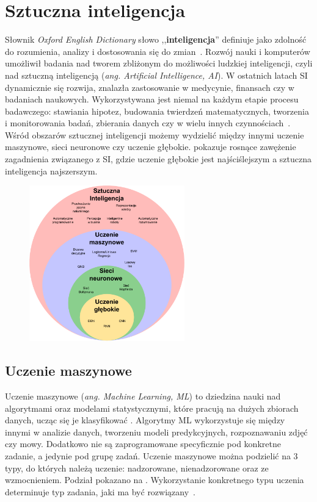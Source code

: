 \chapter{Sztuczna inteligencja}
Słownik \textit{Oxford English Dictionary} słowo ,,\textbf{inteligencja}'' definiuje jako zdolność do rozumienia, analizy i dostosowania się do zmian~\cite{OxfordJuly2023}. Rozwój nauki i komputerów umożliwił badania nad tworem zbliżonym do możliwości ludzkiej inteligencji, czyli nad sztuczną inteligencją (\textit{ang. Artificial Intelligence, AI}). W ostatnich latach SI dynamicznie się rozwija, znalazła zastosowanie w medycynie, finansach czy w badaniach naukowych. Wykorzystywana jest niemal na każdym etapie procesu badawczego: stawiania hipotez, budowania twierdzeń matematycznych, tworzenia i monitorowania badań, zbierania danych czy w wielu innych czynnościach~\cite{AiScience, Mahesh2018}. Wśród obszarów sztucznej inteligencji możemy wydzielić między innymi uczenie maszynowe, sieci neuronowe czy uczenie głębokie.  pokazuje rosnące zawężenie zagadnienia związanego z SI, gdzie uczenie głębokie jest najściślejszym a sztuczna inteligencja najszerszym.

\begin{figure}[H]
    \centering
    \includegraphics[width=0.6\textwidth]{images/si}
    \label{fig:si-schema}
\end{figure}


\section{Uczenie maszynowe}
Uczenie maszynowe (\textit {ang. Machine Learning, ML}) to dziedzina nauki nad algorytmami oraz modelami statystycznymi, które pracują na dużych zbiorach danych, ucząc się je klasyfikować . Algorytmy ML wykorzystuje się między innymi w analizie danych, tworzeniu modeli predykcyjnych, rozpoznawaniu zdjęć czy mowy. Dodatkowo nie są zaprogramowane specyficznie pod konkretne zadanie, a jedynie pod grupę zadań. Uczenie maszynowe można podzielić na 3 typy, do których należą uczenie: nadzorowane, nienadzorowane oraz ze wzmocnieniem. Podział  pokazano na . Wykorzystanie konkretnego typu uczenia determinuje typ zadania, jaki ma być rozwiązany~\cite{Mahesh2018, LinkedInSi}.

